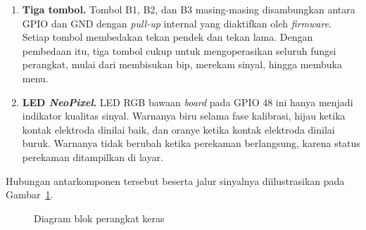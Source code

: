 \begin{enumerate}[label=\alph*.]
  \item \textbf{Tiga tombol.} Tombol B1, B2, dan B3 masing-masing disambungkan antara GPIO dan GND dengan \textit{pull-up} internal yang diaktifkan oleh \textit{firmware}. Setiap tombol membedakan tekan pendek dan tekan lama. Dengan pembedaan itu, tiga tombol cukup untuk mengoperasikan seluruh fungsi perangkat, mulai dari membisukan bip, merekam sinyal, hingga membuka menu.
  \item \textbf{LED \textit{NeoPixel}.} LED RGB bawaan \textit{board} pada GPIO 48 ini hanya menjadi indikator kualitas sinyal. Warnanya biru selama fase kalibrasi, hijau ketika kontak elektroda dinilai baik, dan oranye ketika kontak elektroda dinilai buruk. Warnanya tidak berubah ketika perekaman berlangsung, karena status perekaman ditampilkan di layar.
\end{enumerate}

Hubungan antarkomponen tersebut beserta jalur sinyalnya diilustrasikan pada Gambar~\ref{fig:blok-perangkat-keras}.

\begin{figure}[H]
  \centering
  \caption{Diagram blok perangkat keras}
  \label{fig:blok-perangkat-keras}
\end{figure}

